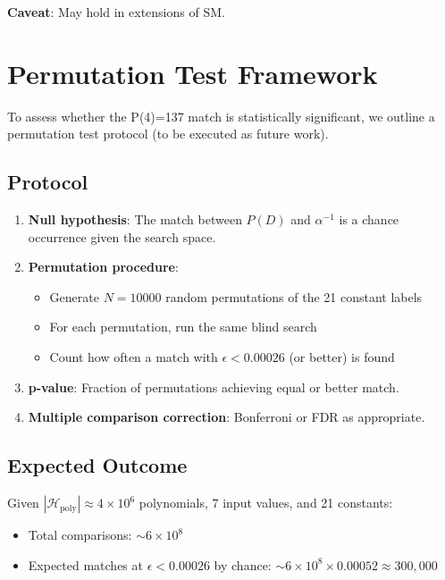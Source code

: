 \documentclass[11pt,a4paper]{article}
\begin{document}
\textbf{Caveat}: May hold in extensions of SM.

\section{Permutation Test Framework}

To assess whether the P(4)=137 match is statistically significant, we outline a permutation test protocol (to be executed as future work).

\subsection{Protocol}

\begin{enumerate}
    \item \textbf{Null hypothesis}: The match between $P(D)$ and $\alpha^{-1}$ is a chance occurrence given the search space.
    
    \item \textbf{Permutation procedure}:
    \begin{itemize}
        \item Generate $N = 10000$ random permutations of the 21 constant labels
        \item For each permutation, run the same blind search
        \item Count how often a match with $\epsilon < 0.00026$ (or better) is found
    \end{itemize}
    
    \item \textbf{p-value}: Fraction of permutations achieving equal or better match.
    
    \item \textbf{Multiple comparison correction}: Bonferroni or FDR as appropriate.
\end{enumerate}

\subsection{Expected Outcome}

Given $|\mathcal{H}_{\text{poly}}| \approx 4 \times 10^6$ polynomials, 7 input values, and 21 constants:

\begin{itemize}
    \item Total comparisons: $\sim 6 \times 10^8$
    \item Expected matches at $\epsilon < 0.00026$ by chance: $\sim 6 \times 10^8 \times 0.00052 \approx 300,000$
\end{itemize}
\end{document}
